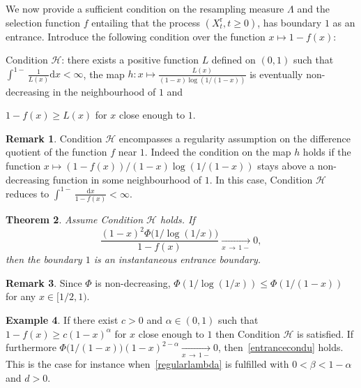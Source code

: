 \documentclass[10pt]{amsart}
\newtheorem{theo}{Theorem}[section]
\theoremstyle{definition}\newtheorem{defi}[theo]{Definition}\newtheorem{rema}[theo]{Remark}\newtheorem{exam}[theo]{Example}\newtheorem{exem}[theo]{Example}\newtheorem{nota}[theo]{Notation}
\newcommand{\ddr}{\mathrm{d}}
\newcommand{\rmr}{\mathrm{r}}
\newcommand{\clH}{\mathcal{H}}
\begin{document}
We now provide a sufficient condition on the resampling measure $\Lambda$ and the selection function $f$ entailing that the process $(X_t^{\rmr},t\geq 0)$, has boundary $1$ as an entrance. Introduce the following condition over the function $x\mapsto 1-f(x)$:

\begin{enonce*}{Condition}
$\clH$: there exists a positive function $L$ defined on $(0,1)$ such that $\int^{1-} \frac{1}{L(x)}\ddr x<\infty$, the map $h:x\mapsto \frac{L(x)}{(1-x)\log\left(1/(1-x)\right)}$ is eventually non-decreasing in the neighbourhood of $1$ and
\begin{center} 
$1-f(x)\geq L(x)$ for $x$ close enough to $1$.
\end{center}
\end{enonce*}

\begin{rema}
Condition $\clH$ encompasses a regularity assumption on the difference quotient of the function $f$ near $1$. Indeed the condition on the map $h$ holds if the function $x\mapsto (1-f(x))/(1-x)\log(1/(1-x))$ stays above a non-decreasing function in some neighbourhood of $1$. In this case, Condition $\clH$ reduces to $\int^{1-}\frac{\ddr x}{1-f(x)}<\infty$.
\end{rema}

\begin{theo}\label{theorementrancef}
Assume Condition $\clH$ holds.
If
\begin{equation}\label{entrancecondu}
\frac{(1-x)^2\Phi\big(1/\log(1/x)\big)}{1-f(x)}\underset{x\,\rightarrow\,1-}{\longrightarrow} 0,
\end{equation}
then the boundary $1$ is an instantaneous entrance boundary.
\end{theo}


\begin{rema}
Since $\Phi$ is non-decreasing, $\Phi(1/\log(1/x))\leq \Phi(1/(1-x))$ for any $x\in [1/2,1)$.
\end{rema}

\begin{exam}
If there exist $c>0$ and $\alpha \in (0,1)$ such that $1-f(x)\geq c(1-x)^{\alpha}$ for $x$ close enough to $1$ then Condition $\clH$ is satisfied. If furthermore $\Phi\big(1/(1-x)\big)(1-x)^{2-\alpha}\underset{x\,\rightarrow\,1-}{\longrightarrow} 0$, then~\eqref{entrancecondu} holds. This is the case for instance when~\eqref{regularlambda} is fulfilled with $0<\beta<1-\alpha$ and $d>0$.
\end{exam}
\end{document}
